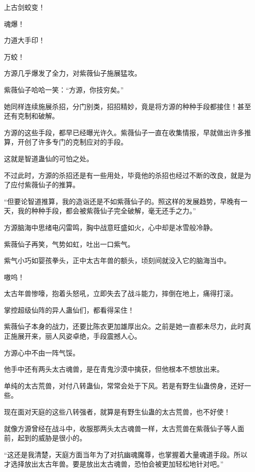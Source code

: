 
\begin{this_body}



上古剑蛟变！

魂爆！

力道大手印！

万蛟！

方源几乎爆发了全力，对紫薇仙子施展猛攻。

紫薇仙子哈哈一笑：“方源，你技穷矣。”

她同样连续施展杀招，分门别类，招招精妙，竟是将方源的种种手段都接住！甚至还有克制和破解。

方源的这些手段，都早已经曝光许久。紫薇仙子一直在收集情报，早就做出许多推算，开创了许多专门的克制应对的手段。

这就是智道蛊仙的可怕之处。

不过此时，方源的杀招还是有一些用处，毕竟他的杀招也经过不断的改良，就是为了应付紫薇仙子的推算。

“但要论智道推算，我的造诣还是不如紫薇仙子的。照这样的发展趋势，早晚有一天，我的种种手段，都会被紫薇仙子完全破解，毫无还手之力。”

方源脑海中思绪电闪雷鸣，胸中战意旺盛如火，心中却是冰雪般冷静。

紫薇仙子再笑，气势如虹，吐出一口紫气。

紫气小巧如婴孩拳头，正中太古年兽的额头，顷刻间就没入它的脑海当中。

嗷呜！

太古年兽惨嚎，抱着头怒吼，立即失去了战斗能力，摔倒在地上，痛得打滚。

掌控超级仙阵的异人蛊仙们，都看得呆住！

紫薇仙子本身的战力，还要比陈衣更加雄厚出众。之前是她一直都未尽力，此时真正施展开来，丽人风姿卓绝，手段震撼人心。

方源心中不由一阵气馁。

他手中还有两头太古魂兽，是在青鬼沙漠中擒获，但他根本不想放出来。

单纯的太古荒兽，对付八转蛊仙，常常会处于下风。若是有野生仙蛊傍身，还好一些。

现在面对天庭的这些八转强者，就算是有野生仙蛊的太古荒兽，也不好使！

就像方源曾经在战斗中，收服那两头太古魂兽一样，太古荒兽在紫薇仙子等人面前，起到的威胁是很小的。

“这还是我清楚，天庭方面当年为了对抗幽魂魔尊，也掌握着大量魂道手段。所以才选择放出太古年兽。要是放出太古魂兽，恐怕会被更加轻松地针对吧。”


\end{this_body}
